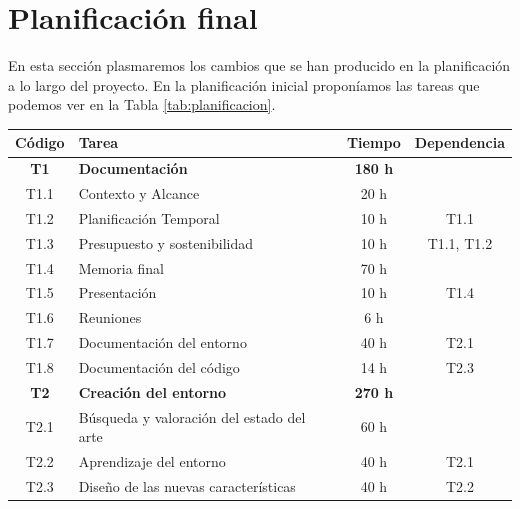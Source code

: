 \section{Planificación final}
En esta sección plasmaremos los cambios que se han producido en la planificación a lo largo del proyecto. En la planificación inicial proponíamos las tareas que podemos ver en la Tabla \ref {tab:planificacion}.
\begin{table}[h]
	\begin{center}
		\begin{tabular}{| c | l | c | c |}
			\hline
			\textbf{Código} & \textbf{Tarea}                               & \textbf{Tiempo} & \textbf{Dependencia} \\ \hline
			\textbf{T1}     & \textbf{Documentación}                       & \textbf{180 h}  &                      \\ \hline
			T1.1            & Contexto y Alcance                           & 20 h            &                      \\
			T1.2            & Planificación Temporal                       & 10 h            & T1.1                 \\
			T1.3            & Presupuesto y sostenibilidad                 & 10 h            & T1.1, T1.2           \\
			T1.4            & Memoria final                                & 70 h            &                      \\
			T1.5            & Presentación                                 & 10 h            & T1.4                 \\
			T1.6            & Reuniones                                    & 6 h             &                      \\
			T1.7            & Documentación del entorno                    & 40 h            & T2.1                 \\
			T1.8            & Documentación del código                     & 14 h            & T2.3                 \\
			\hline
			\textbf{T2}     & \textbf{Creación del entorno}                & \textbf{270 h}  &                      \\ \hline
			T2.1            & Búsqueda y valoración del estado del arte    & 60 h            &                      \\
			T2.2            & Aprendizaje del entorno                      & 40 h            & T2.1                 \\
			T2.3            & Diseño de las nuevas características         & 40 h            & T2.2                 \\

\end{tabular}
\end{center}
\end{table}
